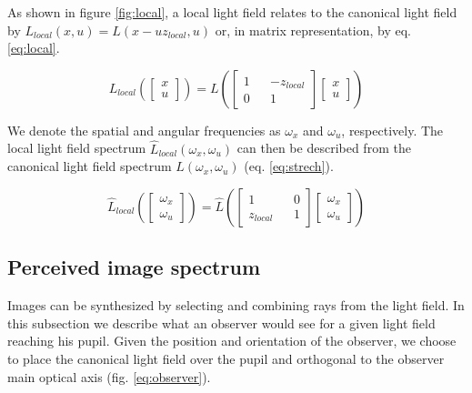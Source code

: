 \documentclass[acmtog,review,anonymous]{acmart}
\begin{document}
As shown in figure \ref{fig:local}, a local light field relates to the canonical light field by $L_{local}(x, u) = L(x - uz_{local}, u)$ or, in matrix representation, by eq. \ref{eq:local}.

\begin{equation} \label{eq:local}
L_{local}\left(\begin{bmatrix}x\\u\end{bmatrix}\right) =
L\left(\begin{bmatrix}1 && -z_{local}\\0 && 1\end{bmatrix} \begin{bmatrix}x\\u\end{bmatrix}\right)
\end{equation}

We denote the spatial and angular frequencies as $\omega_{x}$ and $\omega_{u}$, respectively. The local light field spectrum $\hat{L}_{local}(\omega_{x}, \omega_{u})$ can then be described from the canonical light field spectrum $\hat{L}(\omega_{x}, \omega_{u})$ (eq. \ref{eq:strech}).

\begin{equation} \label{eq:strech}
\hat{L}_{local}\left(\begin{bmatrix}\omega_{x}\\\omega_{u}\end{bmatrix}\right) =
\hat{L}\left(\begin{bmatrix}1 && 0\\z_{local} && 1\end{bmatrix} \begin{bmatrix}\omega_{x}\\\omega_{u}\end{bmatrix}\right)
\end{equation}

\subsection{Perceived image spectrum}

Images can be synthesized by selecting and combining rays from the light field. In this subsection we describe what an observer would see for a given light field reaching his pupil. Given the position and orientation of the observer, we choose to place the canonical light field over the pupil and orthogonal to the observer main optical axis (fig. \ref{eq:observer}).
\end{document}
